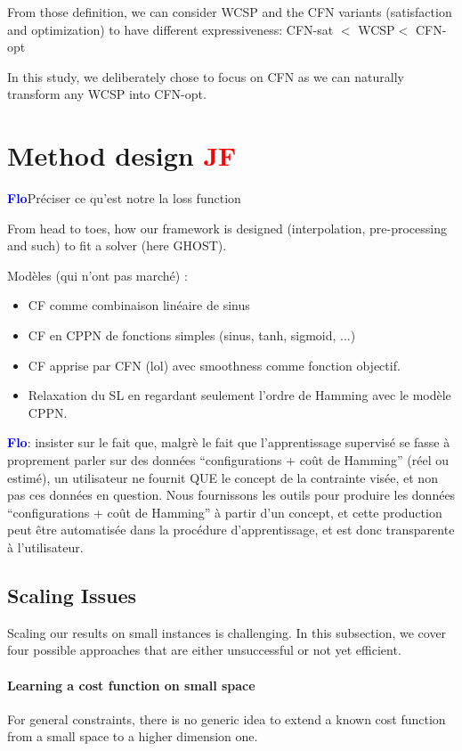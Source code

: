 \documentclass{article}
\newcommand{\cfn}{\textsc{CFN}\xspace}
\newcommand{\wcsp}{\textsc{WCSP}\xspace}
\newcommand{\flo}{\textcolor{blue}{\bf Flo}\xspace}
\newcommand{\jf}{\textcolor{red}{\bf JF}\xspace}
\begin{document}
From those  definition, we  can consider \wcsp  and the  \cfn variants
(satisfaction  and  optimization)  to have  different  expressiveness:
\cfn-sat $<$ \wcsp $<$ \cfn-opt

In  this study,  we deliberately  chose  to focus  on \cfn  as we  can
naturally transform any \wcsp into \cfn-opt.

\section{Method design \jf}\label{sec:method}
\flo{Préciser ce qu'est notre la loss function}

From  head to  toes,  how our  framework  is designed  (interpolation,
pre-processing and such) to fit a solver (here GHOST).

Modèles (qui n'ont pas marché) :
\begin{itemize}
\item CF comme combinaison linéaire de sinus
\item CF en CPPN de fonctions simples (sinus, tanh, sigmoid, ...)
\item CF apprise par CFN (lol) avec smoothness comme fonction objectif.
\item Relaxation du SL en regardant seulement l'ordre  de Hamming  avec
le modèle CPPN.
\end{itemize}

\flo: insister  sur le  fait que, malgrè  le fait  que l'apprentissage
supervisé   se   fasse   à   proprement   parler   sur   des   données
``configurations + coût de Hamming''  (réel ou estimé), un utilisateur
ne  fournit QUE  le concept  de la  contrainte visée,  et non  pas ces
données en  question.  Nous fournissons  les outils pour  produire les
données ``configurations + coût de Hamming'' à partir d'un concept, et
cette   production   peut   être   automatisée   dans   la   procédure
d'apprentissage, et est donc transparente à l'utilisateur.

\subsection{Scaling Issues}\label{subsec:issues}
Scaling our  results on small instances is challenging.  In this subsection, we cover four possible approaches that are either unsuccessful or not yet efficient.

\paragraph{Learning a cost function on small space}
For general constraints, there is no generic idea to extend a known cost function from a small space to a higher dimension one.
\end{document}
